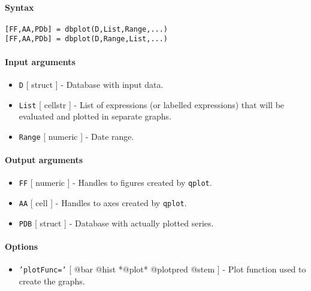


	\paragraph{Syntax}\label{syntax}

\begin{verbatim}
[FF,AA,PDb] = dbplot(D,List,Range,...)
[FF,AA,PDb] = dbplot(D,Range,List,...)
\end{verbatim}

\paragraph{Input arguments}\label{input-arguments}

\begin{itemize}
\item
  \texttt{D} {[} struct {]} - Database with input data.
\item
  \texttt{List} {[} cellstr {]} - List of expressions (or labelled
  expressions) that will be evaluated and plotted in separate graphs.
\item
  \texttt{Range} {[} numeric {]} - Date range.
\end{itemize}

\paragraph{Output arguments}\label{output-arguments}

\begin{itemize}
\item
  \texttt{FF} {[} numeric {]} - Handles to figures created by
  \texttt{qplot}.
\item
  \texttt{AA} {[} cell {]} - Handles to axes created by \texttt{qplot}.
\item
  \texttt{PDB} {[} struct {]} - Database with actually plotted series.
\end{itemize}

\paragraph{Options}\label{options}

\begin{itemize}
\itemsep1pt\parskip0pt
\item
  \texttt{'plotFunc='} {[} @bar \textbar{} @hist \textbar{} *@plot*
  \textbar{} @plotpred \textbar{} @stem {]} - Plot function used to
  create the graphs.
\end{itemize}

